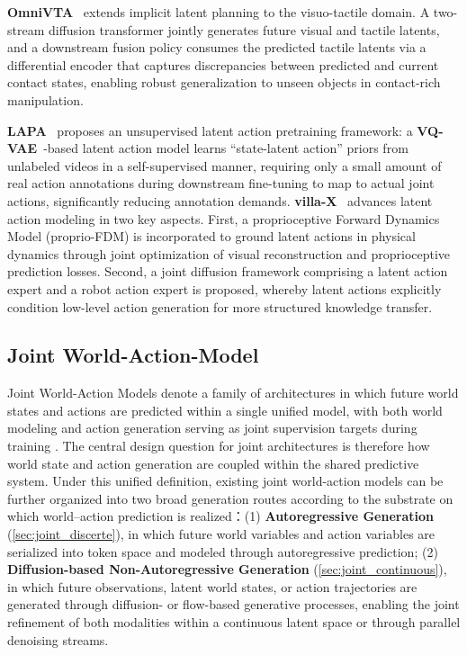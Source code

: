 \textbf{OmniVTA}~\cite{zheng2026omnivta} extends implicit latent planning to the visuo-tactile domain. A two-stream diffusion transformer jointly generates future visual and tactile latents, and a downstream fusion policy consumes the predicted tactile latents via a differential encoder that captures discrepancies between predicted and current contact states, enabling robust generalization to unseen objects in contact-rich manipulation.

\textbf{LAPA}~\cite{LAPA} proposes an unsupervised latent action pretraining framework: a \textbf{VQ-VAE}~\cite{oord2017vqvae}-based latent action model learns ``state-latent action'' priors from unlabeled videos in a self-supervised manner, requiring only a small amount of real action annotations during downstream fine-tuning to map to actual joint actions, significantly reducing annotation demands. \textbf{villa-X}~\cite{chen2025villax} advances latent action modeling in two key aspects. First, a proprioceptive Forward Dynamics Model (proprio-FDM) is incorporated to ground latent actions in physical dynamics through joint optimization of visual reconstruction and proprioceptive prediction losses. Second, a joint diffusion framework comprising a latent action expert and a robot action expert is proposed, whereby latent actions explicitly condition low-level action generation for more structured knowledge transfer.





\subsection{Joint World-Action-Model}

\label{sec:joint_wam}
Joint World-Action Models denote a family of architectures in which future world states and actions are predicted within a single unified model, with both world modeling and action generation serving as joint supervision targets during training \cite{PAD,UWM,UVA,PhysGen,FLARE,FRAPPE,CosmosPolicy,Motus,Act2Goal,DUST,DiT4DiT,CoVAR}. 
The central design question for joint architectures is therefore how world state and action generation are coupled within the shared predictive system. Under this unified definition, existing joint world-action models can be further organized into two broad generation routes according to the substrate on which world--action prediction is realized：(1) \textbf{Autoregressive Generation} (\autoref{sec:joint_discerte}), in which future world variables and action variables are serialized into token space and modeled through autoregressive prediction; (2) \textbf{Diffusion-based Non-Autoregressive Generation} (\autoref{sec:joint_continuous}), in which future observations, latent world states, or action trajectories are generated through diffusion- or flow-based generative processes, enabling the joint refinement of both modalities within a continuous latent space or through parallel denoising streams.



